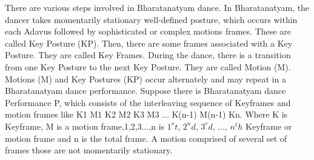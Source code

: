 There are various steps involved in Bharatanatyam dance. 
In Bharatanatyam, the dancer takes momentarily stationary well-defined posture, which occurs within each Adavus followed by sophisticated or complex motions frames. These are called Key Posture (KP).
Then, there are some frames associated with a Key Posture. They are called Key Frames.
During the dance, there is a transition from one Key Posture to the next Key Posture. They are called Motion (M). Motions (M) and Key Postures (KP) occur alternately and may repeat in a Bharatanatyam dance performance. Suppose there is Bharatanatyam dance Performance P, which consists of the interleaving sequence of Keyframes and motion frames like K1 M1 K2 M2 K3 M3 ... K(n-1) M(n-1) Kn. Where K is Keyframe, M is a motion frame,1,2,3...,n is $1^st$, $2^nd$, $3^rd$, ..., $n^th$ Keyframe or motion frame and n is the total frame. A motion comprised of several set of frames those are not momentarily stationary.




















